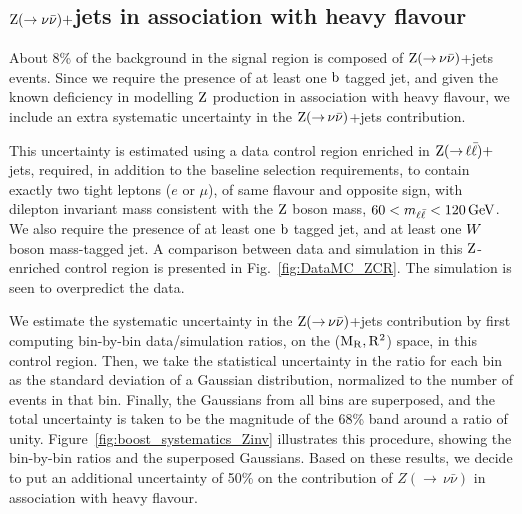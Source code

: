 \subsection{\texorpdfstring{$\mathrm{Z} (\rightarrow \nu \bar{\nu})+$jets}{Z(nunu)+jets} in
association with heavy flavour} 

About 8\% of the background in the signal region is composed of
$\mathrm{Z}({\rightarrow}\,\nu\bar{\nu})$+jets
events. Since we require the presence of at least one $\mathrm{b}$ tagged jet, and given the known
deficiency in modelling $\mathrm{Z}$ production in association with heavy flavour, we include an extra
systematic uncertainty in the $\mathrm{Z}({\rightarrow}\,\nu\bar{\nu})$+jets contribution.  

This uncertainty is estimated using a data control region enriched in
$\mathrm{Z}({\rightarrow}\, \ell \bar{\ell})+$jets, required, in addition to the baseline selection
requirements, to contain exactly two tight leptons ($e$ or $\mu$), of same flavour and opposite
sign, with dilepton invariant mass consistent with the $\mathrm{Z}$ boson mass, $60 < m_{\ell\bar{\ell}} <
120\,\text{Ge\hspace{-.08em}V}$.
We also require the presence of at least one $\mathrm{b}$ tagged jet, and at least one $W$
boson mass-tagged jet.  A comparison between data and simulation in this $\mathrm{Z}$-enriched control
region is presented in Fig.~\ref{fig:DataMC_ZCR}. The simulation is seen to overpredict the data. 

We estimate the systematic uncertainty in the $\mathrm{Z}({\rightarrow}\,\nu\bar{\nu})$+jets contribution
by first computing bin-by-bin data/simulation ratios, on the ($\mathrm{M_R},\mathrm{R^2}$) space, in this control
region. Then, we take the statistical uncertainty in the ratio for each bin as the
standard deviation of a Gaussian distribution, normalized to the number of events in that bin.  
Finally, the Gaussians from all bins are superposed, and the total uncertainty is taken to be the
magnitude of the 68\% band around a ratio of unity. 
Figure~\ref{fig:boost_systematics_Zinv} illustrates this procedure, showing the bin-by-bin ratios
and the superposed Gaussians.
Based on these results, we decide to put an additional uncertainty of 50\% on the contribution of 
$Z({\rightarrow}\,\nu\bar{\nu})$ in association with heavy flavour. 

